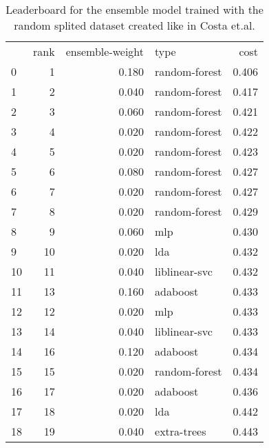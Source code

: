 \begin{table}[]
	\centering
	\begin{tabular}{lrrlr}
		   & rank & ensemble-weight & type          & cost  \\
		0  & 1    & 0.180           & random-forest & 0.406 \\
		1  & 2    & 0.040           & random-forest & 0.417 \\
		2  & 3    & 0.060           & random-forest & 0.421 \\
		3  & 4    & 0.020           & random-forest & 0.422 \\
		4  & 5    & 0.020           & random-forest & 0.423 \\
		5  & 6    & 0.080           & random-forest & 0.427 \\
		6  & 7    & 0.020           & random-forest & 0.427 \\
		7  & 8    & 0.020           & random-forest & 0.429 \\
		8  & 9    & 0.060           & mlp           & 0.430 \\
		9  & 10   & 0.020           & lda           & 0.432 \\
		10 & 11   & 0.040           & liblinear-svc & 0.432 \\
		11 & 13   & 0.160           & adaboost      & 0.433 \\
		12 & 12   & 0.020           & mlp           & 0.433 \\
		13 & 14   & 0.040           & liblinear-svc & 0.433 \\
		14 & 16   & 0.120           & adaboost      & 0.434 \\
		15 & 15   & 0.020           & random-forest & 0.434 \\
		16 & 17   & 0.020           & adaboost      & 0.436 \\
		17 & 18   & 0.020           & lda           & 0.442 \\
		18 & 19   & 0.040           & extra-trees   & 0.443 \\
	\end{tabular}

	\caption{Leaderboard for the ensemble model trained with the random splited dataset created like in Costa et.al.}
	\label{tab:lb-from-costaetal-self-small-randsplit}
\end{table}

